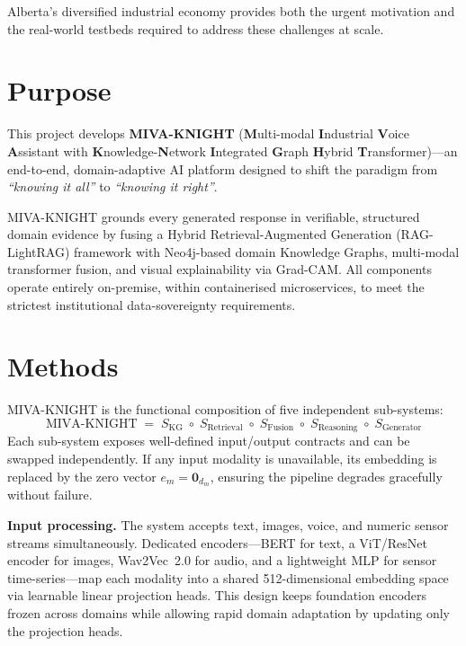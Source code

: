 \documentclass[12pt,a4paper]{article}
\begin{document}
Alberta's diversified industrial economy provides both the urgent motivation and the
real-world testbeds required to address these challenges at scale.

\section*{Purpose}

This project develops \textbf{MIVA-KNIGHT}
(\textbf{M}ulti-modal \textbf{I}ndustrial \textbf{V}oice \textbf{A}ssistant with
\textbf{K}nowledge-\textbf{N}etwork \textbf{I}ntegrated \textbf{G}raph \textbf{H}ybrid
\textbf{T}ransformer)---an end-to-end, domain-adaptive AI platform designed to shift the
paradigm from \emph{``knowing it all''} to \emph{``knowing it right''}.

MIVA-KNIGHT grounds every generated response in verifiable, structured domain evidence
by fusing a Hybrid Retrieval-Augmented Generation (RAG-LightRAG) framework with
Neo4j-based domain Knowledge Graphs, multi-modal transformer fusion, and visual
explainability via Grad-CAM. All components operate entirely on-premise, within
containerised microservices, to meet the strictest institutional data-sovereignty
requirements.

\section*{Methods}

\begin{tcolorbox}[abstractsec, title={Architecture Overview}]
MIVA-KNIGHT is the functional composition of five independent sub-systems:
\[
  \text{MIVA-KNIGHT}
  \;=\; S_{\mathrm{KG}} \;\circ\; S_{\mathrm{Retrieval}}
  \;\circ\; S_{\mathrm{Fusion}} \;\circ\; S_{\mathrm{Reasoning}}
  \;\circ\; S_{\mathrm{Generator}}
\]
Each sub-system exposes well-defined input/output contracts and can be swapped
independently. If any input modality is unavailable, its embedding is replaced by
the zero vector $e_m = \mathbf{0}_{d_m}$, ensuring the pipeline degrades
gracefully without failure.
\end{tcolorbox}

\textbf{Input processing.}
The system accepts text, images, voice, and numeric sensor streams simultaneously.
Dedicated encoders---BERT for text, a ViT/ResNet encoder for images, Wav2Vec~2.0
for audio, and a lightweight MLP for sensor time-series---map each modality into a
shared 512-dimensional embedding space via learnable linear projection heads. This
design keeps foundation encoders frozen across domains while allowing rapid
domain adaptation by updating only the projection heads.
\end{document}
